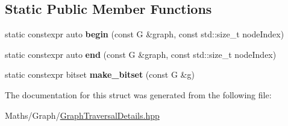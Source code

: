 \subsection*{Static Public Member Functions}
\begin{DoxyCompactItemize}
\item 
\mbox{\label{structsequoia_1_1sequoia_1_1maths_1_1graph__impl_1_1traversal__traits_3_01_g_00_01_q_00_01true_01_4_aad7b1c427cf193289b8b5473974b60ac}} 
static constexpr auto {\bfseries begin} (const G \&graph, const std\+::size\+\_\+t node\+Index)
\item 
\mbox{\label{structsequoia_1_1sequoia_1_1maths_1_1graph__impl_1_1traversal__traits_3_01_g_00_01_q_00_01true_01_4_afebf38ddafabb16567b8ed20c045749a}} 
static constexpr auto {\bfseries end} (const G \&graph, const std\+::size\+\_\+t node\+Index)
\item 
\mbox{\label{structsequoia_1_1sequoia_1_1maths_1_1graph__impl_1_1traversal__traits_3_01_g_00_01_q_00_01true_01_4_a52901588b4a662106ad296c7d64edda8}} 
static constexpr bitset {\bfseries make\+\_\+bitset} (const G \&g)
\end{DoxyCompactItemize}


The documentation for this struct was generated from the following file\+:\begin{DoxyCompactItemize}
\item 
Maths/\+Graph/\mbox{\hyperlink{_graph_traversal_details_8hpp}{Graph\+Traversal\+Details.\+hpp}}\end{DoxyCompactItemize}
